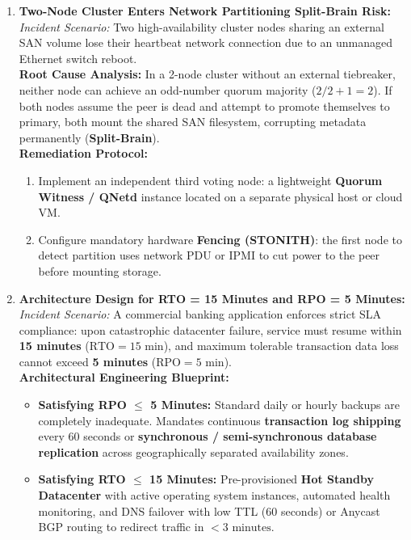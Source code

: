 \begin{enumerate}[label=\textbf{Case \arabic*.},leftmargin=1.5cm]
\item \textbf{Two-Node Cluster Enters Network Partitioning Split-Brain Risk:} \\
\textit{Incident Scenario:} Two high-availability cluster nodes sharing an external SAN volume lose their heartbeat network connection due to an unmanaged Ethernet switch reboot. \\
\textbf{Root Cause Analysis:} In a 2-node cluster without an external tiebreaker, neither node can achieve an odd-number quorum majority ($2 / 2 + 1 = 2$). If both nodes assume the peer is dead and attempt to promote themselves to primary, both mount the shared SAN filesystem, corrupting metadata permanently (\textbf{Split-Brain}). \\
\textbf{Remediation Protocol:}
\begin{enumerate}
    \item Implement an independent third voting node: a lightweight \textbf{Quorum Witness / QNetd} instance located on a separate physical host or cloud VM.
    \item Configure mandatory hardware \textbf{Fencing (STONITH)}: the first node to detect partition uses network PDU or IPMI to cut power to the peer before mounting storage.
\end{enumerate}

\item \textbf{Architecture Design for RTO = 15 Minutes and RPO = 5 Minutes:} \\
\textit{Incident Scenario:} A commercial banking application enforces strict SLA compliance: upon catastrophic datacenter failure, service must resume within \textbf{15 minutes} ($\text{RTO} = 15\text{ min}$), and maximum tolerable transaction data loss cannot exceed \textbf{5 minutes} ($\text{RPO} = 5\text{ min}$). \\
\textbf{Architectural Engineering Blueprint:}
\begin{itemize}
    \item \textbf{Satisfying RPO $\le$ 5 Minutes:} Standard daily or hourly backups are completely inadequate. Mandates continuous \textbf{transaction log shipping} every 60 seconds or \textbf{synchronous / semi-synchronous database replication} across geographically separated availability zones.
    \item \textbf{Satisfying RTO $\le$ 15 Minutes:} Pre-provisioned \textbf{Hot Standby Datacenter} with active operating system instances, automated health monitoring, and DNS failover with low TTL (60 seconds) or Anycast BGP routing to redirect traffic in $< 3\text{ minutes}$.
\end{itemize}
\end{enumerate}



